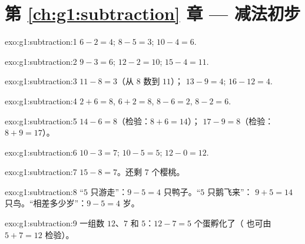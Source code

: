 \section*{第 \ref{ch:g1:subtraction} 章 --- 减法初步}

\begin{solution}{exo:g1:subtraction:1}
$6 - 2 = 4$; \quad $8 - 5 = 3$; \quad $10 - 4 = 6$.
\end{solution}

\begin{solution}{exo:g1:subtraction:2}
$9 - 3 = 6$; \quad $12 - 2 = 10$; \quad $15 - 4 = 11$.
\end{solution}

\begin{solution}{exo:g1:subtraction:3}
$11 - 8 = 3$（从 $8$ 数到 $11$）；\quad
$13 - 9 = 4$; \quad $16 - 12 = 4$.
\end{solution}

\begin{solution}{exo:g1:subtraction:4}
$2 + 6 = 8$, \quad $6 + 2 = 8$, \quad $8 - 6 = 2$, \quad
$8 - 2 = 6$.
\end{solution}

\begin{solution}{exo:g1:subtraction:5}
$14 - 6 = 8$（检验：$8 + 6 = 14$）；\quad
$17 - 9 = 8$（检验：$8 + 9 = 17$）。
\end{solution}

\begin{solution}{exo:g1:subtraction:6}
$10 - 3 = 7$; \quad $10 - 5 = 5$; \quad $12 - 0 = 12$.
\end{solution}

\begin{solution}{exo:g1:subtraction:7}
$15 - 8 = 7$。还剩 $7$ 个樱桃。
\end{solution}

\begin{solution}{exo:g1:subtraction:8}
“$5$ 只游走”：$9 - 5 = 4$ 只鸭子。“$5$ 只鹅飞来”：
$9 + 5 = 14$ 只鸟。“相差多少岁”：$9 - 5 = 4$ 岁。
\end{solution}

\begin{solution}{exo:g1:subtraction:9}
一组数 $12$、$7$ 和 $5$：$12 - 7 = 5$ 个蛋孵化了（
也可由 $5 + 7 = 12$ 检验）。
\end{solution}
